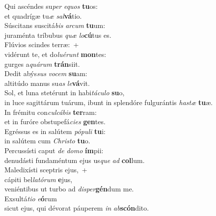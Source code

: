 \oddverse Qui ascéndes su\textit{per} \textit{e}\textit{quos} \textbf{tu}os:~\*\\
\oddverse et quadrígæ tu\textit{æ} \textit{sal}\textbf{vá}tio.\\
\evenverse Súscitans suscitá\textit{bis} \textit{ar}\textit{cum} \textbf{tu}um:~\*\\
\evenverse juraménta tríbubus \textit{quæ} \textit{lo}\textbf{cú}tus es.\\
\oddverse Flúvios scindes terræ:~+\\
\oddverse  vidérunt te, et do\textit{lu}\textit{é}\textit{runt} \textbf{mon}tes:~\*\\
\oddverse gurges a\textit{quá}\textit{rum} \textbf{trán}siit.\\
\evenverse Dedit abýs\textit{sus} \textit{vo}\textit{cem} \textbf{su}am:~\*\\
\evenverse altitúdo manus su\textit{as} \textit{le}\textbf{vá}vit.\\
\oddverse Sol, et luna stetérunt in habi\textit{tá}\textit{cu}\textit{lo} \textbf{su}o,~\*\\
\oddverse in luce sagittárum tuárum, ibunt in splendóre fulgurántis \textit{ha}\textit{stæ} \textbf{tu}æ.\\
\evenverse In frémitu con\textit{cul}\textit{cá}\textit{bis} \textbf{ter}ram:~\*\\
\evenverse et in furóre obstupefá\textit{ci}\textit{es} \textbf{gen}tes.\\
\oddverse Egréssus es in salútem \textit{pó}\textit{pu}\textit{li} \textbf{tu}i:~\*\\
\oddverse in salútem cum \textit{Chri}\textit{sto} \textbf{tu}o.\\
\evenverse Percussísti caput \textit{de} \textit{do}\textit{mo} \textbf{ím}pii:~\*\\
\evenverse denudásti fundaméntum ejus us\textit{que} \textit{ad} \textbf{col}lum.\\
\oddverse Maledixísti sceptris ejus,~+\\
\oddverse  cápiti bel\textit{la}\textit{tó}\textit{rum} \textbf{e}jus,~\*\\
\oddverse veniéntibus ut turbo ad \textit{di}\textit{sper}\textbf{gén}dum me.\\
\evenverse Exsultá\textit{ti}\textit{o} \textit{e}\textbf{ó}rum~\*\\
\evenverse sicut ejus, qui dévorat páuperem \textit{in} \textit{ab}\textbf{scón}dito.\\
